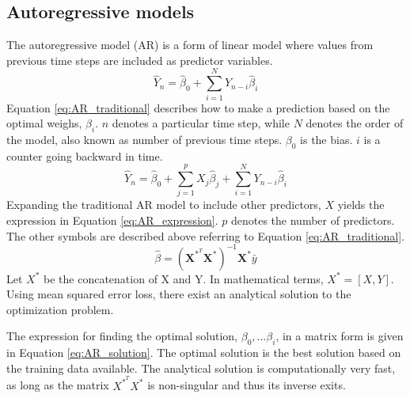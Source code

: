 \documentclass{article}
\begin{document}
\subsection{Autoregressive models} \label{sec:ARmodels}
The autoregressive model (AR) is a form of linear model where values from previous time steps are included as predictor variables. 
\begin{equation} \label{eq:AR_traditional}
    \hat{Y}_n = \hat{\beta}_0 + \sum_{i = 1}^{N} Y_{n-i} \hat{\beta}_{i}
\end{equation}
Equation \eqref{eq:AR_traditional} describes how to make a prediction based on the optimal weighs, $\beta_i$. $n$ denotes a particular time step, while $N$ denotes the order of the model, also known as number of previous time steps. $\beta_0$ is the bias. $i$ is a counter going backward in time.
\begin{equation} \label{eq:AR_expression}
    \hat{Y}_n = \hat{\beta}_0 + \sum_{j=1}^p X_j\hat{\beta}_j + \sum_{i = 1}^{N} Y_{n-i}\hat{\beta}_{i}
\end{equation}
Expanding the traditional AR model to include other predictors, $X$ yields the expression in Equation \ref{eq:AR_expression}. $p$ denotes the number of predictors. The other symbols are described above referring to Equation \ref{eq:AR_traditional}.
\begin{equation} \label{eq:AR_solution}
    \hat{ \beta } = \left( \textbf{X}^{*^T}\textbf{X}^* \right)^{-1}\textbf{X}^*\bar{y}
\end{equation}
Let $X^*$ be the concatenation of X and Y. In mathematical terms, $X^*=[X, Y]$. Using mean squared error loss, there exist an analytical solution to the optimization problem. 


The expression for finding the optimal solution, $\beta_0,...\beta_i$, in a matrix form is given in Equation \eqref{eq:AR_solution}. The optimal solution is the best solution based on the training data available. The analytical solution is computationally very fast, as long as the matrix $X^*^TX^*$ is non-singular and thus its inverse exits.
\end{document}
